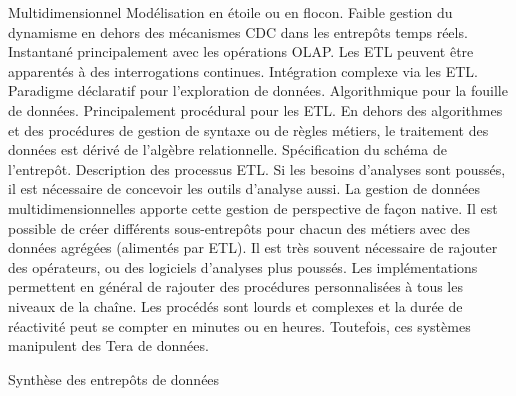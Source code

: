 \begin{table}[!ht]
\criteretabDonnee
    {Multidimensionnel}
    {Modélisation en étoile ou en flocon.}
    {Faible gestion du dynamisme en dehors des mécanismes CDC dans les entrepôts temps réels.}
\criteretabTraitement
    {Instantané principalement avec les opérations OLAP. Les ETL peuvent être apparentés à des interrogations continues.}
    {Intégration complexe via les ETL.}
    {Paradigme déclaratif pour l'exploration de données. Algorithmique pour la fouille de données. Principalement procédural pour les ETL.}
    {En dehors des algorithmes et des procédures de gestion de syntaxe ou de règles métiers, le traitement des données est dérivé de l'algèbre relationnelle.}
\criteretabAdaptabilite
    {Spécification du schéma de l'entrepôt. Description des processus ETL. Si les besoins d'analyses sont poussés, il est nécessaire de concevoir les outils d'analyse aussi.}
    {La gestion de données multidimensionnelles apporte cette gestion de perspective de façon native. Il est possible de créer différents sous-entrepôts pour chacun des métiers avec des données agrégées (alimentés par ETL).}
    {Il est très souvent nécessaire de rajouter des opérateurs, ou des logiciels d'analyses plus poussés. Les implémentations permettent en général de rajouter des procédures personnalisées à tous les niveaux de la chaîne.}
    {Les procédés sont lourds et complexes et la durée de réactivité peut se compter en minutes ou en heures. Toutefois, ces systèmes manipulent des Tera de données.}
\caption{Synthèse des entrepôts de données}\label{tab:rw:supervision:warehouses:synthese}
\end{table}
